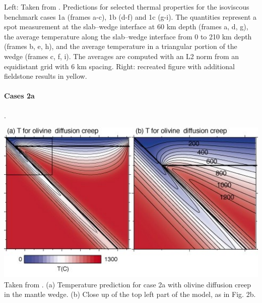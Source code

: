 \begin{landscape}
{\captionfont Left: Taken from \cite{vack08}. 
Predictions for selected thermal properties for the isoviscous benchmark cases 1a 
(frames a-c), 1b (d-f) and 1c (g-i). The quantities represent a spot measurement at
the slab–wedge interface at 60 km depth (frames a, d, g), the average temperature 
along the slab–wedge interface from 0 to 210 km depth (frames b, e, h), and the
average temperature in a triangular portion of the wedge (frames c, f, i). 
The averages are computed with an L2 norm from an equidistant grid with 6 km spacing.
Right: recreated figure with additional fieldstone results in yellow.
}
\end{landscape}

 
\paragraph{Cases 2a}.

\begin{center}
\includegraphics[width=14cm]{python_codes/fieldstone_68/images/fig4}\\
{\captionfont Taken from \cite{vack08}. 
(a) Temperature prediction for case 2a with olivine diffusion creep in 
the mantle wedge. (b) Close up of the top left part of the model, as in Fig. 2b.
}
\end{center}

